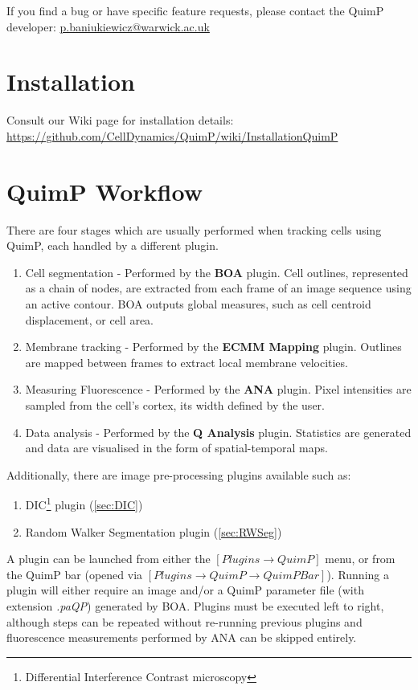 \documentclass[a4paper,12pt]{article}
\begin{document}
If you find a bug or have specific feature requests, please contact the QuimP developer: \href{mailto:p.baniukiewicz@warwick.ac.uk}{p.baniukiewicz@warwick.ac.uk}

\section{Installation}

Consult our Wiki page for installation details: \url{https://github.com/CellDynamics/QuimP/wiki/InstallationQuimP}

\section{QuimP Workflow}

There are four stages which are usually performed when tracking cells using QuimP, each handled by a different plugin.

\begin{enumerate}
	\item Cell segmentation - Performed by the \textbf{BOA} plugin.  Cell outlines, represented as a chain of nodes, are extracted from each frame of an image sequence using an active contour. BOA outputs global measures, such as cell centroid displacement, or cell area.
	\item Membrane tracking - Performed by the \textbf{ECMM Mapping} plugin.  Outlines are mapped between frames to extract local membrane velocities.
	\item Measuring Fluorescence - Performed by the \textbf{ANA} plugin.  Pixel intensities are sampled from the cell's cortex, its width defined by the user.
	\item Data analysis - Performed by the \textbf{Q Analysis} plugin. Statistics are generated and data are visualised in the form of spatial-temporal maps.
\end{enumerate}

Additionally, there are image pre-processing plugins available such as:

\begin{enumerate}
	\item DIC\footnote{Differential Interference Contrast microscopy} plugin (\autoref{sec:DIC})
	\item Random Walker Segmentation plugin (\autoref{sec:RWSeg})
\end{enumerate}

A plugin can be launched from either the $[Plugins\rightarrow QuimP]$ menu, or from the QuimP bar
(opened via $[Plugins\rightarrow QuimP\rightarrow QuimP Bar]$).
Running a plugin will either require an image and/or a QuimP parameter file (with extension \textit{.paQP}) generated by BOA.
Plugins must be executed left to right, although steps can be repeated without re-running previous plugins and fluorescence measurements performed by ANA can be skipped entirely.
\end{document}
